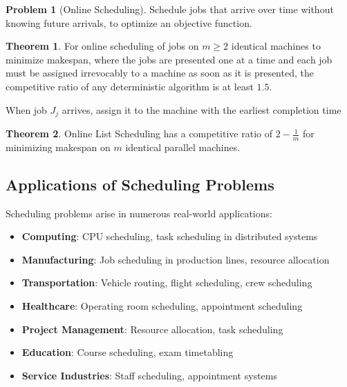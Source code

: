 \documentclass{article}
\theoremstyle{definition}
\newtheorem{problem}{Problem}
\newtheorem{theorem}{Theorem}
\begin{document}
\begin{problem}[Online Scheduling]
Schedule jobs that arrive over time without knowing future arrivals, to optimize an objective function.
\end{problem}

\begin{theorem}
For online scheduling of jobs on $m \geq 2$ identical machines to minimize makespan, where the jobs are presented one at a time and each job must be assigned irrevocably to a machine as soon as it is presented, the competitive ratio of any deterministic algorithm is at least $1.5$.
\end{theorem}

\begin{algorithm}[H]
\caption{Online List Scheduling}
\begin{algorithmic}[1]
\State When job $J_j$ arrives, assign it to the machine with the earliest completion time
\end{algorithmic}
\end{algorithm}

\begin{theorem}
Online List Scheduling has a competitive ratio of $2 - \frac{1}{m}$ for minimizing makespan on $m$ identical parallel machines.
\end{theorem}

\subsection*{Applications of Scheduling Problems}

Scheduling problems arise in numerous real-world applications:

\begin{itemize}
    \item \textbf{Computing}: CPU scheduling, task scheduling in distributed systems
    \item \textbf{Manufacturing}: Job scheduling in production lines, resource allocation
    \item \textbf{Transportation}: Vehicle routing, flight scheduling, crew scheduling
    \item \textbf{Healthcare}: Operating room scheduling, appointment scheduling
    \item \textbf{Project Management}: Resource allocation, task scheduling
    \item \textbf{Education}: Course scheduling, exam timetabling
    \item \textbf{Service Industries}: Staff scheduling, appointment systems
\end{itemize}
\end{document}
